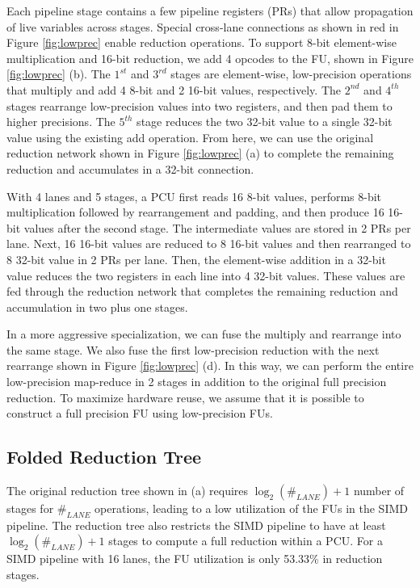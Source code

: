 Each pipeline stage contains a few pipeline registers (PRs)
  that allow propagation of live variables across stages.
Special cross-lane connections as shown in red in Figure \ref{fig:lowprec} enable reduction operations.
To support 8-bit element-wise multiplication and 16-bit reduction, we add 4 opcodes to the FU, shown in
Figure \ref{fig:lowprec} (b).
The $1^{st}$ and $3^{rd}$ stages are element-wise, low-precision operations
  that multiply and add 4 8-bit and 2 16-bit values, respectively.
The $2^{nd}$ and $4^{th}$ stages rearrange low-precision values into two registers,
  and then pad them to higher precisions.
The $5^{th}$ stage reduces the two 32-bit value to a single 32-bit value using the existing add operation. 
From here, we can use the original reduction network shown in Figure \ref{fig:lowprec} (a) to complete the remaining reduction and accumulates
in a 32-bit connection.

With 4 lanes and 5 stages,
  a PCU first reads 16 8-bit values,
  performs 8-bit multiplication followed by rearrangement and padding,
  and then produce 16 16-bit values after the second stage.
The intermediate values are stored in 2 PRs per lane.
Next, 16 16-bit values are reduced to 8 16-bit values
  and then rearranged to 8 32-bit value in 2 PRs per lane.
Then, the element-wise addition in a 32-bit value
  reduces the two registers in each line into 4 32-bit values.
These values are fed through the
  reduction network that completes the remaining
  reduction and accumulation in two plus one stages.

In a more aggressive specialization,
  we can fuse the multiply and rearrange into the same stage.
We also fuse the first low-precision reduction with the next rearrange shown in Figure \ref{fig:lowprec} (d).
In this way, we can perform the entire low-precision map-reduce in 2 stages in addition to the original full precision reduction.
To maximize hardware reuse,
  we assume that it is possible to construct a full precision FU
  using low-precision FUs.

\subsection{Folded Reduction Tree} \label{sec:foldrt}
The original reduction tree shown in  (a) requires $\log_2(\#_{LANE})+1$ number of
stages for $\#_{LANE}$ operations, leading to a low utilization of the FUs in the SIMD pipeline.
The reduction tree also restricts the SIMD pipeline to have at least 
$\log_2(\#_{LANE})+1$ stages to compute a full reduction within a PCU.
For a SIMD pipeline with 16 lanes, the FU utilization is only 53.33\% in reduction stages.

